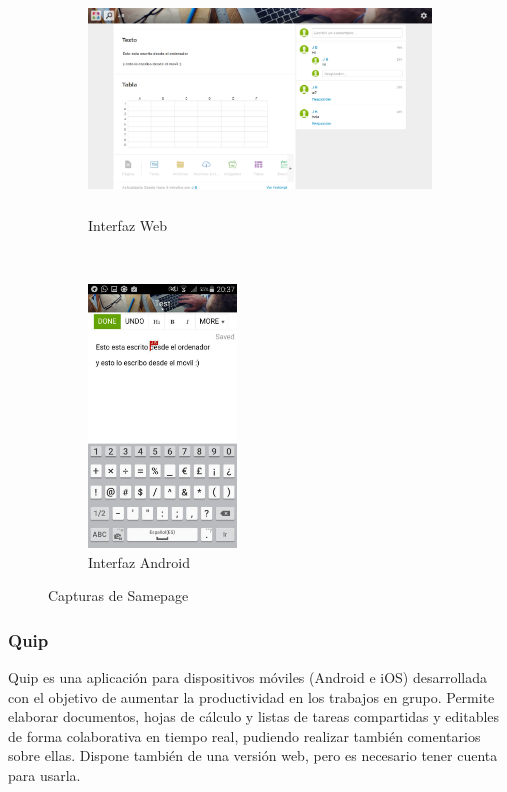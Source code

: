 	\begin{figure}[H]
        \centering
        \begin{subfigure}[b]{0.6\textwidth}
                \includegraphics[width=\textwidth, height=6cm]{Media/Captures/samepageWeb.png}
                \caption{Interfaz Web}
                \label{fig:samepageWeb}
        \end{subfigure}
        ~
        \begin{subfigure}[b]{0.3\textwidth}
                \includegraphics[width=\textwidth, height=7cm]{Media/Captures/samepageApp.jpg}
                \caption{Interfaz Android}
                \label{fig:samepageApp}
        \end{subfigure}
        \caption{Capturas de Samepage}\label{fig:samepageCaptures}
	\end{figure}
	
	
	\subsubsection{Quip}
	
	Quip \cite{ref:quip} es una aplicación para dispositivos móviles (Android e iOS) desarrollada con el objetivo de aumentar la productividad en los trabajos en grupo. Permite elaborar documentos, hojas de cálculo y listas de tareas compartidas y editables de forma colaborativa en tiempo real, pudiendo realizar también comentarios sobre ellas. Dispone también de una versión web, pero es necesario tener cuenta para usarla.
	
